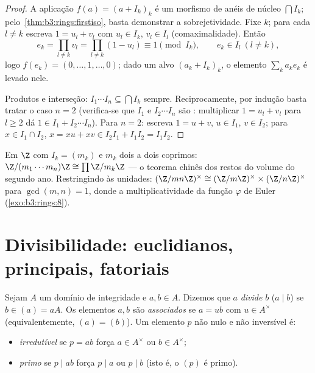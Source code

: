 \begin{proof}
A aplicação $f(a) = (a + I_k)_k$ é um morfismo de anéis de núcleo $\bigcap I_k$; pelo~\cref{thm:b3:rings:firstiso},
basta demonstrar a sobrejetividade. Fixe $k$; para cada $l \neq k$
escreva $1 = u_l +
v_l$ com $u_l \in I_k$, $v_l \in I_l$ (comaximalidade). Então
\[
e_k = \prod_{l \neq k} v_l = \prod_{l\neq k}(1 - u_l)
\equiv 1 \pmod{I_k},
\qquad e_k \in I_l \ (l \neq k),
\]
logo $f(e_k) = (0, \dots, 1, \dots, 0)$; dado um alvo $(a_k +
I_k)_k$, o elemento $\sum_k a_k e_k$ é levado nele.

Produtos e interseção: $I_1\cdots I_n \subseteq \bigcap I_k$ sempre. Reciprocamente, por indução basta
tratar o caso $n = 2$ (verifica-se que $I_1$ e $I_2\cdots I_n$ são
: multiplicar $1 = u_l + v_l$ para $l \geq 2$ dá $1 \in I_1 + I_2\cdots
I_n$). Para $n = 2$:
escreva $1 = u + v$, $u \in I_1$, $v \in I_2$; para $x \in I_1 \cap I_2$, $x = xu + xv \in I_2I_1 + I_1I_2 =
I_1I_2$.
\end{proof}

\begin{example}\label{ex:b3:rings:crtz}
Em $\Z$ com $I_k = (m_k)$ e $m_k$ dois a dois coprimos: $\Z/(m_1\cdots
m_n)\Z \cong \prod \Z/m_k\Z$ --- o
teorema chinês dos restos do volume do segundo ano. Restringindo às
unidades: $(\Z/mn\Z)^\times \cong
(\Z/m\Z)^\times \times (\Z/n\Z)^\times$ para $\gcd(m,n)=1$, donde a multiplicatividade da função $\varphi$
de Euler (\cref{exo:b3:rings:8}).
\end{example}

\section{Divisibilidade: euclidianos, principais, fatoriais}

\begin{definition}\label{def:b3:rings:divisibility}
Sejam $A$ um domínio de integridade e $a, b \in A$. Dizemos que $a$
\emph{divide} $b$ ($a \mid b$) se $b \in (a) = aA$. Os elementos $a,
b$ são
\emph{associados} se $a = ub$ com $u \in A^\times$
(equivalentemente, $(a) = (b)$). Um elemento $p$ não nulo e não inversível
é:
\begin{itemize}
  \item \emph{irredutível} se $p = ab$
        força $a \in A^\times$ ou $b \in A^\times$;
  \item \emph{primo} se $p \mid ab$ força $p
        \mid a$ ou
        $p \mid b$ (isto é, o  $(p)$ é primo).
\end{itemize}
\end{definition}

